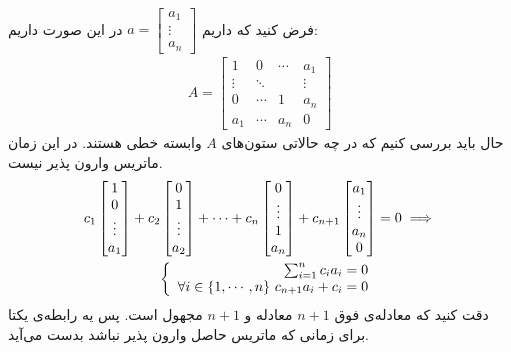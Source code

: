 \\
فرض کنید که داریم
$a = \begin{bmatrix}
    a_1 \\
    \vdots\\
    a_n
\end{bmatrix}$
در این صورت داریم:
\begin{gather*}
    A = \begin{bmatrix}
        1 & 0 & \cdots & a_1\\
        \vdots & \ddots &  & \vdots\\
        0 & \cdots & 1 & a_n\\
        a_1 & \cdots & a_n & 0
    \end{bmatrix}
\end{gather*}
حال باید بررسی کنیم که در چه حالاتی ستون‌های
$A$
وابسته خطی هستند. در این زمان ماتریس وارون پذیر نیست.
\begin{gather*}
    c_1\begin{bmatrix}
        1\\
        0\\
        \vdots\\
        a_1
    \end{bmatrix}
    + c_2\begin{bmatrix}
        0\\
        1\\
        \vdots\\
        a_2
    \end{bmatrix}
    + \cdots + c_n\begin{bmatrix}
        0\\
        \vdots\\
        1\\
        a_n
    \end{bmatrix}
    +
    c_{n+1}\begin{bmatrix}
        a_1\\
        \vdots\\
        a_n\\
        0
    \end{bmatrix}
    = 0 \implies \\
    \quad
    \left\{\begin{array}{r@{\mskip\thickmuskip}l}
        \sum_{i=1}^{n} c_i a_i = 0\\
        \forall i \in \{1,\cdots,n\} ~ c_{n+1} a_i + c_i = 0
    \end{array}\right.
\end{gather*}
دقت کنید که معادله‌ی فوق
$n+1$
معادله و
$n+1$
مجهول است. پس یه رابطه‌ی یکتا برای زمانی که ماتریس حاصل وارون پذیر نباشد بدست می‌آید.